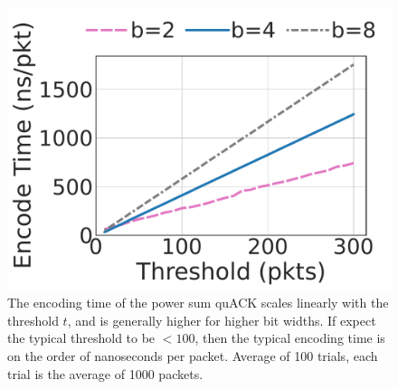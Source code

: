 \begin{figure}[t]
\centering
\includegraphics[width=0.37\linewidth,trim={3mm 0 7mm 0},clip]{quack/figures/fig2c_quack_threshold_vs_encode_time.pdf}
\caption{The encoding time of the power sum quACK scales linearly with the
 threshold $t$, and is generally higher for higher bit widths. If expect the
 typical threshold to be $<100$, then the typical encoding time is on the order
 of nanoseconds per packet. Average of 100
 trials, each trial is the average of 1000 packets.}
\label{fig:quack:psum-encode}
\end{figure}
